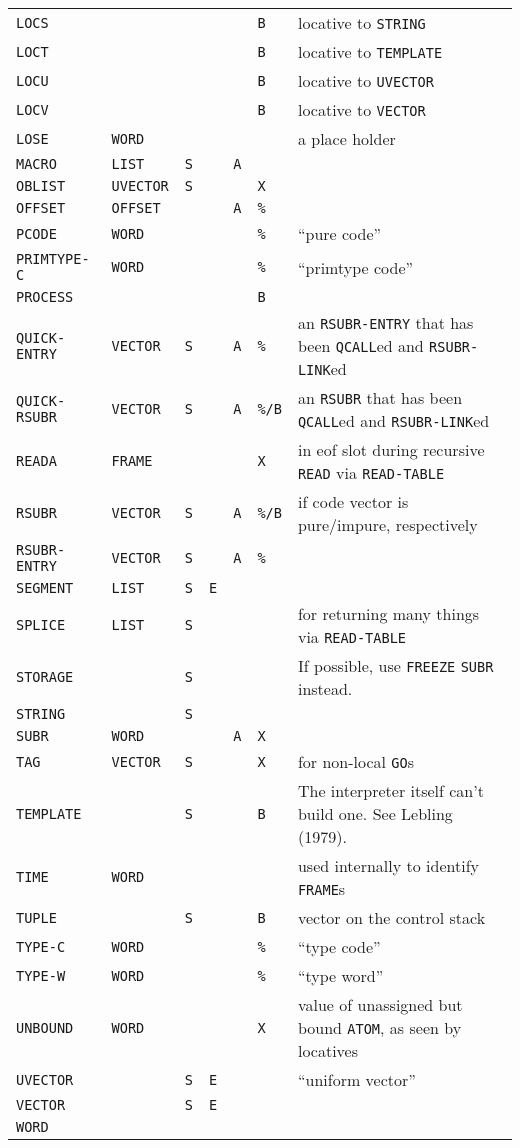 \documentclass[a4paper]{scrbook}
\begin{document}
\begin{longtable}[]{@{}lllllll@{}}
\texttt{LOCS} & & & & & \texttt{B} & locative to \texttt{STRING}\tabularnewline
\texttt{LOCT} & & & & & \texttt{B} & locative to \texttt{TEMPLATE}\tabularnewline
\texttt{LOCU} & & & & & \texttt{B} & locative to \texttt{UVECTOR}\tabularnewline
\texttt{LOCV} & & & & & \texttt{B} & locative to \texttt{VECTOR}\tabularnewline
\texttt{LOSE} & \texttt{WORD} & & & & & a place holder\tabularnewline
\texttt{MACRO} & \texttt{LIST} & \texttt{S} & & \texttt{A} & &\tabularnewline
\texttt{OBLIST} & \texttt{UVECTOR} & \texttt{S} & & & \texttt{X} &\tabularnewline
\texttt{OFFSET} & \texttt{OFFSET} & & & \texttt{A} & \texttt{\%} &\tabularnewline
\texttt{PCODE} & \texttt{WORD} & & & & \texttt{\%} & ``pure code''\tabularnewline
\texttt{PRIMTYPE-C} & \texttt{WORD} & & & & \texttt{\%} & ``primtype code''\tabularnewline
\texttt{PROCESS} & & & & & \texttt{B} &\tabularnewline
\texttt{QUICK-ENTRY}\index{\texttt{QUICK-ENTRY}} & \texttt{VECTOR} & \texttt{S} & & \texttt{A} & \texttt{\%} & an
\texttt{RSUBR-ENTRY} that has been \texttt{QCALL}ed and \texttt{RSUBR-LINK}ed\tabularnewline
\texttt{QUICK-RSUBR}\index{\texttt{QUICK-RSUBR}} & \texttt{VECTOR} & \texttt{S} & & \texttt{A} & \texttt{\%/B} & an
\texttt{RSUBR} that has been \texttt{QCALL}ed and \texttt{RSUBR-LINK}ed\tabularnewline
\texttt{READA} & \texttt{FRAME} & & & & \texttt{X} & in eof slot during recursive \texttt{READ} via
\texttt{READ-TABLE}\tabularnewline
\texttt{RSUBR} & \texttt{VECTOR} & \texttt{S} & & \texttt{A} & \texttt{\%/B} & if code vector is pure/impure,
respectively\tabularnewline
\texttt{RSUBR-ENTRY} & \texttt{VECTOR} & \texttt{S} & & \texttt{A} & \texttt{\%} &\tabularnewline
\texttt{SEGMENT} & \texttt{LIST} & \texttt{S} & \texttt{E} & & &\tabularnewline
\texttt{SPLICE} & \texttt{LIST} & \texttt{S} & & & & for returning many things via \texttt{READ-TABLE}\tabularnewline
\texttt{STORAGE} & & \texttt{S} & & & & If possible, use \texttt{FREEZE} \texttt{SUBR} instead.\tabularnewline
\texttt{STRING} & & \texttt{S} & & & &\tabularnewline
\texttt{SUBR} & \texttt{WORD} & & & \texttt{A} & \texttt{X} &\tabularnewline
\texttt{TAG} & \texttt{VECTOR} & \texttt{S} & & & \texttt{X} & for non-local \texttt{GO}s\tabularnewline
\texttt{TEMPLATE} & & \texttt{S} & & & \texttt{B} & The interpreter itself can't build one. See Lebling
(1979).\tabularnewline
\texttt{TIME} & \texttt{WORD} & & & & & used internally to identify \texttt{FRAME}s\tabularnewline
\texttt{TUPLE} & & \texttt{S} & & & \texttt{B} & vector on the control stack\tabularnewline
\texttt{TYPE-C} & \texttt{WORD} & & & & \texttt{\%} & ``type code''\tabularnewline
\texttt{TYPE-W} & \texttt{WORD} & & & & \texttt{\%} & ``type word''\tabularnewline
\texttt{UNBOUND}\index{\texttt{UNBOUND}} & \texttt{WORD} & & & & \texttt{X} & value of unassigned but bound \texttt{ATOM},
as seen by locatives\tabularnewline
\texttt{UVECTOR} & & \texttt{S} & \texttt{E} & & & ``uniform vector''\tabularnewline
\texttt{VECTOR} & & \texttt{S} & \texttt{E} & & &\tabularnewline
\texttt{WORD} & & & & & &\tabularnewline
\bottomrule
\end{longtable}
\end{document}
